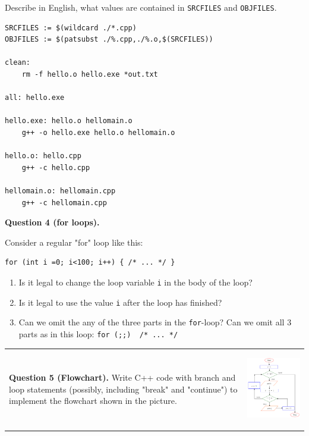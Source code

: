 \documentclass[11pt]{article}
\begin{document}
Describe in English, what values are contained in 
{\tt SRCFILES} and {\tt OBJFILES}.


\begin{Verbatim}[frame=single]
SRCFILES := $(wildcard ./*.cpp)
OBJFILES := $(patsubst ./%.cpp,./%.o,$(SRCFILES))

clean:
	rm -f hello.o hello.exe *out.txt

all: hello.exe

hello.exe: hello.o hellomain.o
	g++ -o hello.exe hello.o hellomain.o

hello.o: hello.cpp
	g++ -c hello.cpp

hellomain.o: hellomain.cpp
	g++ -c hellomain.cpp
\end{Verbatim}


{\bf Question 4 (for loops).}

Consider a regular "for" loop like this: 
\begin{verbatim}
for (int i =0; i<100; i++) { /* ... */ }
\end{verbatim}

\begin{enumerate}
\item Is it legal to change the loop variable {\tt i} 
in the body of the loop?
\item Is it legal to use the value {\tt i} after the loop 
has finished?
\item Can we omit the any of the three parts in the {\tt for}-loop?
Can we omit all $3$ parts as in this loop: {\tt for (;;) { /* ... */ }}
\end{enumerate}



\vspace{5mm}
\begin{tabular}{@{}ll@{}} 
\begin{minipage}{0.48\columnwidth}
{\bf Question 5 (Flowchart).} 
Write C++ code with branch and loop statements
(possibly, including "break" and "continue") to 
implement the flowchart shown in the picture.
\end{minipage} &
\begin{minipage}{0.5\columnwidth}
\begin{center}
\includegraphics[width=3in]{sample-assignment01-flowchart.png}
\end{center}
\end{minipage}
\end{tabular}
\end{document}
